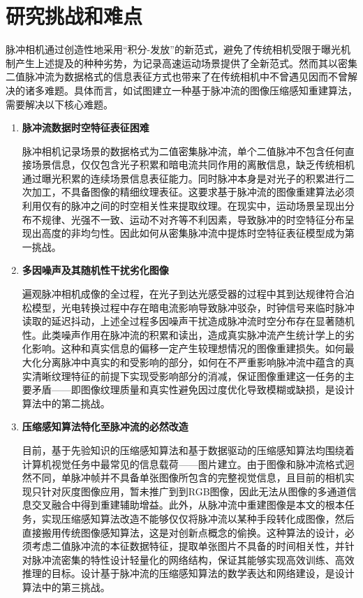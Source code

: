 \section{研究挑战和难点}
脉冲相机通过创造性地采用“积分-发放”的新范式，避免了传统相机受限于曝光机制产生上述提及的种种劣势，为记录高速运动场景提供了全新范式。然而其以密集二值脉冲流为数据格式的信息表征方式也带来了在传统相机中不曾遇见因而不曾解决的诸多难题。具体而言，如试图建立一种基于脉冲流的图像压缩感知重建算法，需要解决以下核心难题。
\begin{enumerate}
  \item \textbf{脉冲流数据时空特征表征困难}

        脉冲相机记录场景的数据格式为二值密集脉冲流，单个二值脉冲不包含任何直接场景信息，仅仅包含光子积累和暗电流共同作用的离散信息，缺乏传统相机通过曝光积累的连续场景信息表征能力。同时脉冲本身是对光子的积累进行二次加工，不具备图像的精细纹理表征。这要求基于脉冲流的图像重建算法必须利用仅有的脉冲之间的时空相关性来提取纹理。在现实中，运动场景呈现出分布不规律、光强不一致、运动不对齐等不利因素，导致脉冲的时空特征分布呈现出高度的非均匀性。因此如何从密集脉冲流中提炼时空特征表征模型成为第一挑战。

  \item \textbf{多因噪声及其随机性干扰劣化图像}

        遍观脉冲相机成像的全过程，在光子到达光感受器的过程中其到达规律符合泊松模型，光电转换过程中存在暗电流影响导致脉冲驳杂，时钟信号来临时脉冲读取的延迟抖动，上述全过程多因噪声干扰造成脉冲流时空分布存在显著随机性。此类噪声作用在脉冲流的积累和读出，造成真实脉冲流产生统计学上的劣化影响。这种和真实信息的偏移一定产生较理想情况的图像重建损失。如何最大化分离脉冲中真实的和受影响的部分，如何在不严重影响脉冲流中蕴含的真实清晰纹理特征的前提下实现受影响部分的消减，保证图像重建这一任务的主要矛盾——即图像纹理质量和真实性避免因过度优化导致模糊或缺损，是设计算法中的第二挑战。

  \item \textbf{压缩感知算法特化至脉冲流的必然改造}

        目前，基于先验知识的压缩感知算法和基于数据驱动的压缩感知算法均围绕着计算机视觉任务中最常见的信息载荷——图片建立。由于图像和脉冲流格式迥然不同，单脉冲帧\cite{Huang_Tiejun110}并不具备单张图像所包含的完整视觉信息，且目前的相机实现只针对灰度图像应用，暂未推广到到RGB图像，因此无法从图像的多通道信息交叉融合中得到重建辅助增益。此外，从脉冲流中重建图像是本文的根本任务，实现压缩感知算法改造不能够仅仅将脉冲流以某种手段转化成图像，然后直接搬用传统图像感知算法，这是对创新点概念的偷换。这种算法的设计，必须考虑二值脉冲流的本征数据特征，提取单张图片不具备的时间相关性，并针对脉冲流密集的特性设计轻量化的网络结构，保证其能够实现高效训练、高效推理的目标。设计基于脉冲流的压缩感知算法的数学表达和网络建设，是设计算法中的第三挑战。


\end{enumerate}
